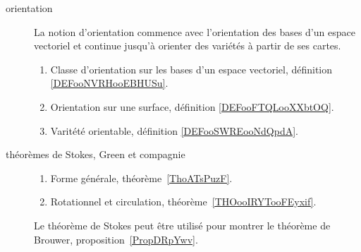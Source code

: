 \begin{description}
    \item[orientation]
        La notion d'orientation commence avec l'orientation des bases d'un espace vectoriel et continue jusqu'à orienter des variétés à partir de ses cartes.
        \begin{enumerate}
            \item
                Classe d'orientation sur les bases d'un espace vectoriel, définition \ref{DEFooNVRHooEBHUSu}.
            \item
                Orientation sur une surface, définition \ref{DEFooFTQLooXXbtOQ}.
            \item
                Varitété orientable, définition \ref{DEFooSWREooNdQpdA}.
        \end{enumerate}
    \item[théorèmes de Stokes, Green et compagnie] 
    \begin{enumerate}
        \item
            Forme générale, théorème~\ref{ThoATsPuzF}.
        \item
            Rotationnel et circulation, théorème~\ref{THOooIRYTooFEyxif}.
        \end{enumerate}
        Le théorème de Stokes peut être utilisé pour montrer le théorème de Brouwer, proposition~\ref{PropDRpYwv}.
\end{description}


